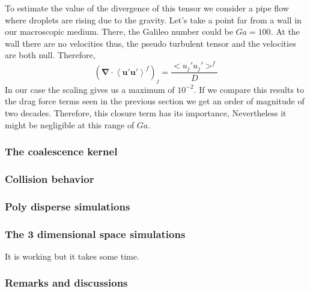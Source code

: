 To estimate the value of the divergence of this tensor we consider a pipe flow where droplets are rising due to the gravity. 
Let's take a point far from a wall in our macroscopic medium. 
There, the Galileo number could be $Ga = 100$.
At the wall there are no velocities thus, the pseudo turbulent tensor and the velocities are both null.   
Therefore, 
\begin{equation*}    
    \left(\bm{\nabla} \cdot \left<\bm{u}'\bm{u}'\right>^f \right)_j = \frac{<u_j' u_j'>^f}{D}
\end{equation*}
In our case the scaling gives us a maximum of $10^{-2}$. 
If we compare this results to the drag force terms seen in the previous section we get an order of magnitude of two decades.
Therefore, this closure term has its importance, Nevertheless it might be negligible at this range of $Ga$. 

\subsubsection{The coalescence kernel}
\subsubsection{Collision behavior}
\subsubsection{Poly disperse simulations}

\subsubsection*{The 3 dimensional space simulations} 
It is working but it takes some time.
\subsubsection{Remarks and discussions}
